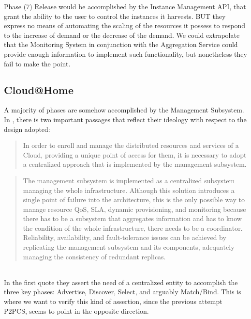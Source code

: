 \documentclass[11pt]{amsart}
\begin{document}
        Phase (7) {Release} would be accomplished by the Instance Management API, that
        grant the ability to the user to control the instances it harvests. BUT they
        express no means of automating the scaling of the resources it possess to respond
        to the increase of demand or the decrease of the demand. We could extrapolate that
        the Monitoring System in conjunction with the Aggregation Service could provide
        enough information to implement such functionality, but nonetheless they fail to
        make the point.

        \subsection{Cloud@Home}
        A majority of phases are somehow accomplished by the Management Subsystem. In
        \cite{cunsolo2010open}, there is two important passages that reflect their
        ideology with respect to the design adopted:

        \begin{quote}
          In order to enroll and manage the distributed resources and services of a Cloud,
          providing a unique point of access for them, it is necessary to adopt a
          centralized approach that is implemented by the management subsystem.
        \end{quote}

        \begin{quote}
          The management subsystem is implemented as a centralized subsystem managing the
          whole infrastructure. Although this solution introduces a single point of
          failure into the architecture, this is the only possible way to manage resource
          QoS, SLA, dynamic provisioning, and monitoring because there has to be a
          subsystem that aggregates information and has to know the condition of the whole
          infrastructure, there needs to be a coordinator. Reliability, availability, and
          fault-tolerance issues can be achieved by replicating the management subsystem
          and its components, adequately managing the consistency of redundant replicas.
        \end{quote}

        \\ In the first quote they assert the need of a centralized entity to accomplish
        the three key phases: Advertise, Discover, Select, and arguably Match/Bind. This
        is where we want to verify this kind of assertion, since the previous attempt
        P2PCS, seems to point in the opposite direction.  
        
\end{document}
